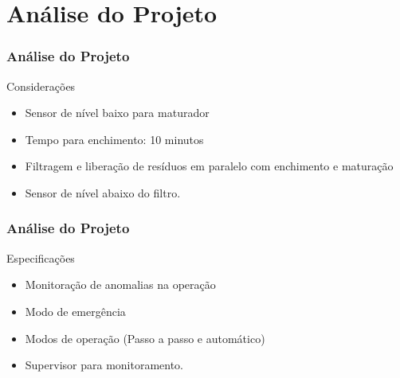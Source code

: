 \documentclass{beamer}
\begin{document}
\section{Análise do Projeto}
\begin{frame}
\frametitle{Análise do Projeto}
	\begin{block}{Considerações}
		\begin{itemize}
		\item Sensor de nível baixo para maturador
		\item Tempo para enchimento: 10 minutos
		\item Filtragem e liberação de resíduos em paralelo com enchimento e maturação
		\item Sensor de nível abaixo do filtro.
		\end{itemize}
	\end{block}
\end{frame}

\begin{frame}
	\frametitle{Análise do Projeto}
	\begin{block}{Especificações}
		\begin{itemize}
			\item Monitoração de anomalias na operação
			\item Modo de emergência
			\item Modos de operação (Passo a passo e automático)
			\item Supervisor para monitoramento.
		\end{itemize}
	\end{block}
\end{frame}
\end{document}
